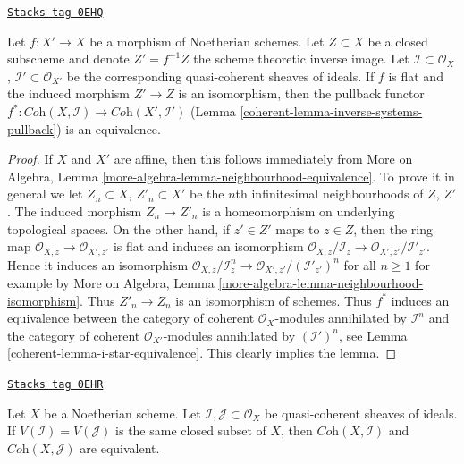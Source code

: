 \begin{lemma}
\label{coherent-lemma-inverse-systems-pullback-equivalence}
\href{https://stacks.math.columbia.edu/tag/0EHQ}{\texttt{Stacks tag 0EHQ}}

Let $f : X' \to X$ be a morphism of Noetherian schemes. Let $Z \subset X$
be a closed subscheme and denote $Z' = f^{-1}Z$ the scheme theoretic
inverse image. Let $\mathcal{I} \subset \mathcal{O}_X$,
$\mathcal{I}' \subset \mathcal{O}_{X'}$ be the corresponding
quasi-coherent sheaves of ideals.
If $f$ is flat and the induced morphism $Z' \to Z$
is an isomorphism, then the pullback functor
$f^* : \textit{Coh}(X, \mathcal{I}) \to \textit{Coh}(X', \mathcal{I}')$
(Lemma \ref{coherent-lemma-inverse-systems-pullback})
is an equivalence.
\end{lemma}

\begin{proof}

If $X$ and $X'$ are affine, then this follows immediately from
More on Algebra, Lemma \ref{more-algebra-lemma-neighbourhood-equivalence}.
To prove it in general we let $Z_n \subset X$, $Z'_n \subset X'$
be the $n$th infinitesimal neighbourhoods of $Z$, $Z'$.
The induced morphism $Z_n \to Z'_n$ is a homeomorphism on
underlying topological spaces. On the other hand, if $z' \in Z'$
maps to $z \in Z$, then the ring map
$\mathcal{O}_{X, z} \to \mathcal{O}_{X', z'}$ is flat
and induces an isomorphism
$\mathcal{O}_{X, z}/\mathcal{I}_z \to \mathcal{O}_{X', z'}/\mathcal{I}'_{z'}$.
Hence it induces an isomorphism
$\mathcal{O}_{X, z}/\mathcal{I}_z^n \to
\mathcal{O}_{X', z'}/(\mathcal{I}'_{z'})^n$
for all $n \geq 1$ for example by
More on Algebra, Lemma \ref{more-algebra-lemma-neighbourhood-isomorphism}.
Thus $Z'_n \to Z_n$ is an isomorphism of schemes.
Thus $f^*$ induces an equivalence between the
category of coherent $\mathcal{O}_X$-modules annihilated by $\mathcal{I}^n$
and the
category of coherent $\mathcal{O}_{X'}$-modules annihilated by
$(\mathcal{I}')^n$, see
Lemma \ref{coherent-lemma-i-star-equivalence}.
This clearly implies the lemma.
\end{proof}

\begin{lemma}
\label{coherent-lemma-inverse-systems-ideals-equivalence}
\href{https://stacks.math.columbia.edu/tag/0EHR}{\texttt{Stacks tag 0EHR}}

Let $X$ be a Noetherian scheme. Let
$\mathcal{I}, \mathcal{J} \subset \mathcal{O}_X$
be quasi-coherent sheaves of ideals.
If $V(\mathcal{I}) = V(\mathcal{J})$ is the same closed subset
of $X$, then $\textit{Coh}(X, \mathcal{I})$ and $\textit{Coh}(X, \mathcal{J})$
are equivalent.
\end{lemma}

